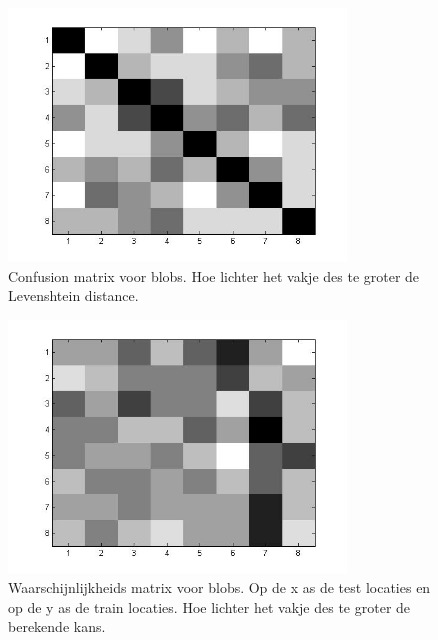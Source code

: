 \documentclass[a4paper]{article}
\begin{document}
\begin{figure}[h]
	\centering
	\includegraphics[width=0.8\textwidth]{confusion_blob.jpg}
	\caption{Confusion matrix voor blobs. Hoe lichter het vakje des te groter de Levenshtein distance.}
	\label{fig:confusion_blob}
\end{figure}

\begin{figure}[h]
	\centering
	\includegraphics[width=0.8\textwidth]{blob_prob.jpg}
	\caption{Waarschijnlijkheids matrix voor blobs. Op de x as de test locaties en op de y as de train locaties. Hoe lichter het vakje des te groter de berekende kans.}
	\label{fig:blob_prob}
\end{figure}
\end{document}
